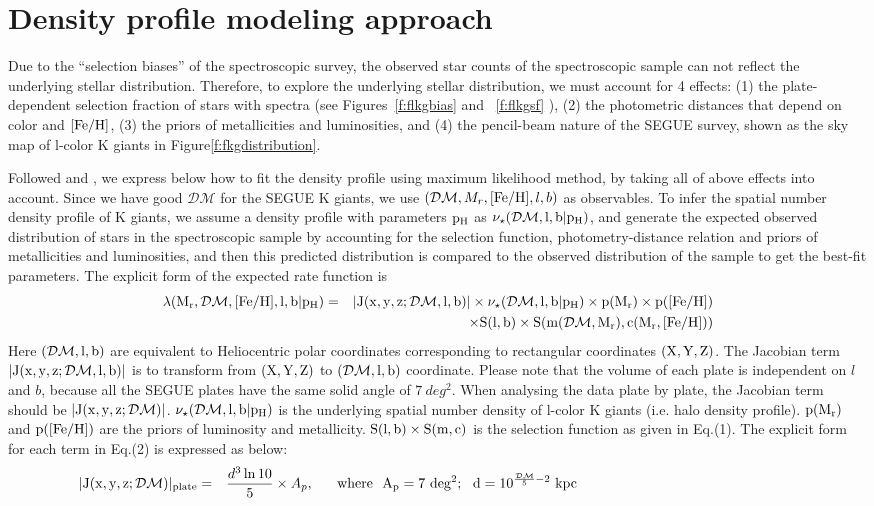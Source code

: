 \documentclass[12pt,preprint]{aastex}
\newcommand{\DM}{\mathcal{DM}}
\newcommand{\feh}{{\rm [Fe/H]}}
\begin{document}
\section{Density profile modeling approach}
Due to the ``selection biases'' of the spectroscopic survey, the observed star counts of the spectroscopic sample can not reflect the underlying stellar distribution. Therefore, to explore the underlying stellar distribution, we must account for 4 effects: (1) the plate-dependent selection fraction of stars with spectra (see Figures~\ref{f:flkgbias} and ~\ref{f:flkgsf} ), (2) the photometric distances that depend on color and $\rm \feh$, (3) the priors of metallicities and luminosities, and (4) the pencil-beam nature of the SEGUE survey, shown as the sky map of l-color K giants in Figure\ref{f:fkgdistribution}. 

Followed \citet{Bovy2012} and \citet{Rix2013}, we express below how to fit the density profile using maximum likelihood method, by taking all of above effects into account. Since we have good $\DM$ for the SEGUE K giants, we use $(\DM,M_r,\feh,l,b)$ as observables. To infer the spatial number density profile of K giants, we assume a density profile with parameters $\rm p_H$ as $\nu_\star(\rm \DM,l,b|p_H)$, and generate the expected observed distribution of stars in the spectroscopic sample by accounting for the selection function, photometry-distance relation and priors of metallicities and luminosities, and then this predicted distribution is compared to the observed distribution of the sample to get the best-fit parameters. The explicit form of the expected rate function is
\begin{eqnarray}
\rm \lambda(M_r,\DM,\feh,l,b|p_H)&=&\rm |J(x,y,z;\DM,l,b)|\times \nu_\star(\DM,l,b|p_H)\times p(M_r)\times p(\feh)  \nonumber\\
&&\rm \times S(l,b) \times S(m(\DM,M_r),c(M_r,\feh))
 \end{eqnarray}
Here $\rm (\DM,l,b)$ are equivalent to Heliocentric polar coordinates corresponding to rectangular coordinates $\rm (X, Y, Z)$. The Jacobian term $\rm |J(x,y,z;\DM,l,b)|$ is to transform from $\rm (X, Y,Z)$ to $\rm (\DM, l, b)$ coordinate. Please note that the volume of each plate is independent on $l$ and $b$, because all the SEGUE plates have the same solid angle of $7~deg^2$. When analysing the data plate by plate, the Jacobian term should be $\rm |J(x,y,z;\DM)|$. $\nu_\star(\rm \DM,l,b|p_H)$ is the underlying spatial number density of l-color K giants (i.e. halo density profile). $\rm p(M_r)$ and $\rm p(\feh)$ are the priors of luminosity and metallicity. $\rm S(l,b)\times S(m,c)$ is the selection function as given in Eq.(1). The explicit form for each term in Eq.(2) is expressed as below:
\begin{eqnarray}
\rm |J(x,y,z;\DM)|_{plate}&=&\frac{d^3\ln10}{5}\times A_p,~~~~~\rm where~~A_p=7~deg^2;~~d=10^{\frac{\DM}{5}-2}~kpc~~~~~~~~~~~~~~~~~~~~~~~~~~~~~~~~~~~~~~~~~~~~~~~\nonumber
 \end{eqnarray}
\end{document}
